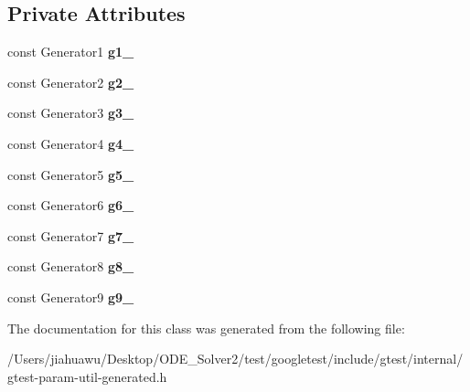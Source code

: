 \subsection*{Private Attributes}
\begin{DoxyCompactItemize}
\item 
\mbox{\label{classtesting_1_1internal_1_1_cartesian_product_holder9_a729b06a268bac92a0e8264cf25d9d1a3}} 
const Generator1 {\bfseries g1\+\_\+}
\item 
\mbox{\label{classtesting_1_1internal_1_1_cartesian_product_holder9_aec512e6ebccab973f6e281a6e8d95266}} 
const Generator2 {\bfseries g2\+\_\+}
\item 
\mbox{\label{classtesting_1_1internal_1_1_cartesian_product_holder9_a859752b169cb09897b238c5b8c35b7f7}} 
const Generator3 {\bfseries g3\+\_\+}
\item 
\mbox{\label{classtesting_1_1internal_1_1_cartesian_product_holder9_ad1e82536ec23059909cea641aba318b0}} 
const Generator4 {\bfseries g4\+\_\+}
\item 
\mbox{\label{classtesting_1_1internal_1_1_cartesian_product_holder9_af2c054f3b1ded0b749ab2b1c88cb373e}} 
const Generator5 {\bfseries g5\+\_\+}
\item 
\mbox{\label{classtesting_1_1internal_1_1_cartesian_product_holder9_a76e3b9d7f1e38dcf5649fe0e765d23e3}} 
const Generator6 {\bfseries g6\+\_\+}
\item 
\mbox{\label{classtesting_1_1internal_1_1_cartesian_product_holder9_a9d4911b6d62092fa04e9601d6b604add}} 
const Generator7 {\bfseries g7\+\_\+}
\item 
\mbox{\label{classtesting_1_1internal_1_1_cartesian_product_holder9_ac6d5f1d80d12f38c2d08b88b98959160}} 
const Generator8 {\bfseries g8\+\_\+}
\item 
\mbox{\label{classtesting_1_1internal_1_1_cartesian_product_holder9_aad717597315c41d2933affec767e2c70}} 
const Generator9 {\bfseries g9\+\_\+}
\end{DoxyCompactItemize}


The documentation for this class was generated from the following file\+:\begin{DoxyCompactItemize}
\item 
/\+Users/jiahuawu/\+Desktop/\+O\+D\+E\+\_\+\+Solver2/test/googletest/include/gtest/internal/gtest-\/param-\/util-\/generated.\+h\end{DoxyCompactItemize}
